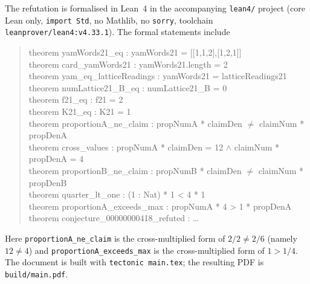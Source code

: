 \documentclass[11pt]{article}
\theoremstyle{definition}
\theoremstyle{remark}
\begin{document}
The refutation is formalised in Lean~4 in the accompanying \texttt{lean4/}
project (core Lean only, \texttt{import Std}, no Mathlib, no \texttt{sorry},
toolchain \texttt{leanprover/lean4:v4.33.1}). The formal statements include

\begin{quote}\ttfamily
theorem yamWords21\_eq : yamWords21 = [[1,1,2],[1,2,1]]\\
theorem card\_yamWords21 : yamWords21.length = 2\\
theorem yam\_eq\_latticeReadings : yamWords21 = latticeReadings21\\
theorem numLattice21\_B\_eq : numLattice21\_B = 0\\
theorem f21\_eq : f21 = 2\\
theorem K21\_eq : K21 = 1\\
theorem proportionA\_ne\_claim : propNumA * claimDen \(\ne\) claimNum * propDenA\\
theorem cross\_values : propNumA * claimDen = 12 \(\wedge\) claimNum * propDenA = 4\\
theorem proportionB\_ne\_claim : propNumB * claimDen \(\ne\) claimNum * propDenB\\
theorem quarter\_lt\_one : (1 : Nat) * 1 < 4 * 1\\
theorem proportionA\_exceeds\_max : propNumA * 4 > 1 * propDenA\\
theorem conjecture\_00000000418\_refuted : \dots
\end{quote}

\noindent
Here \texttt{proportionA\_ne\_claim} is the cross-multiplied form of
$2/2\ne2/6$ (namely $12\ne4$) and \texttt{proportionA\_exceeds\_max} is the
cross-multiplied form of $1>1/4$. The document is built with
\texttt{tectonic main.tex}; the resulting PDF is \texttt{build/main.pdf}.
\end{document}
